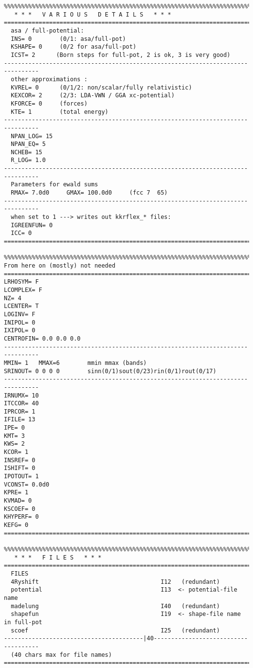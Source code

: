 \documentclass[11pt,fleqn]{book} %
\begin{document}
\begin{VBox}
{{\begin{verbatim}
%%%%%%%%%%%%%%%%%%%%%%%%%%%%%%%%%%%%%%%%%%%%%%%%%%%%%%%%%%%%%%%%%%%%%%%%%%%%%%%%
   * * *   V A R I O U S   D E T A I L S   * * *
================================================================================
  asa / full-potential:
  INS= 0        (0/1: asa/full-pot)
  KSHAPE= 0     (0/2 for asa/full-pot)
  ICST= 2      (Born steps for full-pot, 2 is ok, 3 is very good)
--------------------------------------------------------------------------------
  other approximations :
  KVREL= 0      (0/1/2: non/scalar/fully relativistic)
  KEXCOR= 2     (2/3: LDA-VWN / GGA xc-potential)
  KFORCE= 0     (forces)
  KTE= 1        (total energy)
--------------------------------------------------------------------------------
  NPAN_LOG= 15
  NPAN_EQ= 5
  NCHEB= 15
  R_LOG= 1.0
--------------------------------------------------------------------------------
  Parameters for ewald sums
  RMAX= 7.0d0     GMAX= 100.0d0     (fcc 7  65)
--------------------------------------------------------------------------------
  when set to 1 ---> writes out kkrflex_* files:
  IGREENFUN= 0
  ICC= 0
================================================================================

%%%%%%%%%%%%%%%%%%%%%%%%%%%%%%%%%%%%%%%%%%%%%%%%%%%%%%%%%%%%%%%%%%%%%%%%%%%%%%%%
From here on (mostly) not needed
================================================================================
LRHOSYM= F
LCOMPLEX= F
NZ= 4
LCENTER= T
LOGINV= F
INIPOL= 0
IXIPOL= 0
CENTROFIN= 0.0 0.0 0.0
--------------------------------------------------------------------------------
MMIN= 1   MMAX=6        mmin mmax (bands)
SRINOUT= 0 0 0 0        sinn(0/1)sout(0/23)rin(0/1)rout(0/17)
--------------------------------------------------------------------------------
IRNUMX= 10
ITCCOR= 40
IPRCOR= 1
IFILE= 13
IPE= 0
KMT= 3
KWS= 2
KCOR= 1
INSREF= 0
ISHIFT= 0
IPOTOUT= 1
VCONST= 0.0d0
KPRE= 1
KVMAD= 0
KSCOEF= 0
KHYPERF= 0
KEFG= 0
================================================================================

%%%%%%%%%%%%%%%%%%%%%%%%%%%%%%%%%%%%%%%%%%%%%%%%%%%%%%%%%%%%%%%%%%%%%%%%%%%%%%%%
   * * *   F I L E S   * * *
================================================================================
  FILES
  4Ryshift                                   I12   (redundant)
  potential                                  I13  <- potential-file name
  madelung                                   I40   (redundant)
  shapefun                                   I19  <- shape-file name in full-pot
  scoef                                      I25   (redundant)
----------------------------------------|40-------------------------------------
  (40 chars max for file names)
================================================================================


\end{verbatim}}}
\end{VBox}
\end{document}
